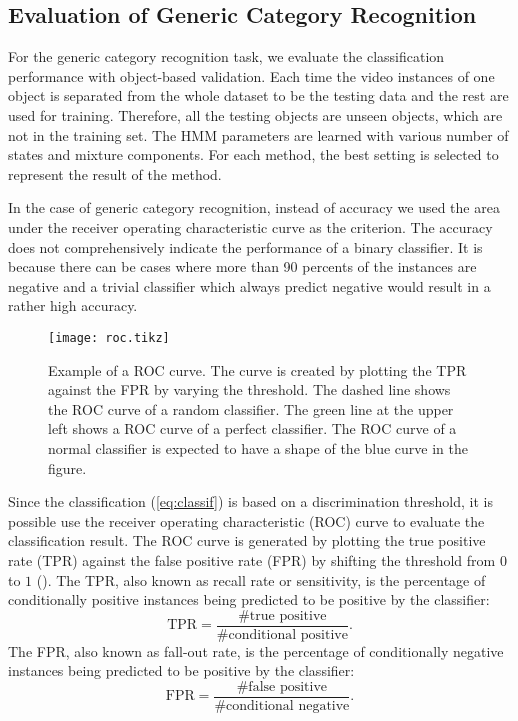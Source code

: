 \documentclass[12pt,final,twoside]{report}
\begin{document}
\subsection{Evaluation of Generic Category Recognition}
For the generic category recognition task, we evaluate the classification performance with object-based validation. Each time the video instances of one object is separated from the whole dataset to be the testing data and the rest are used for training. Therefore, all the testing objects are unseen objects, which are not in the training set. The HMM parameters are learned with various number of states and mixture components. For each method, the best setting is selected to represent the result of the method.

In the case of generic category recognition, instead of accuracy we used the area under the receiver operating characteristic curve as the criterion. The accuracy does not comprehensively indicate the performance of a binary classifier. It is because there can be cases where more than 90 percents of the instances are negative and a trivial classifier which always predict negative would result in a rather high accuracy.

\begin{figure}[t]
  \centering
  \texttt{[image: roc.tikz]}
  \caption[Example of a ROC curve.]{Example of a ROC curve. The curve is created by plotting the TPR against the FPR by varying the threshold. The dashed line shows the ROC curve of a random classifier. The green line at the upper left shows a ROC curve of a perfect classifier. The ROC curve of a normal classifier is expected to have a shape of the blue curve in the figure.}
  \label{fig:roc}
\end{figure}

Since the classification (\cref{eq:classif}) is based on a discrimination threshold, it is possible use the receiver operating characteristic (ROC) curve to evaluate the classification result. The ROC curve is generated by plotting the true positive rate (TPR) against the false positive rate (FPR) by shifting the threshold from $0$ to $1$ (). The TPR, also known as recall rate or sensitivity, is the percentage of conditionally positive instances being predicted to be positive by the classifier:
\[ \text{TPR} =  \frac{\text{\# true positive}}{\text{\# conditional positive}} . \]
The FPR, also known as fall-out rate, is the percentage of conditionally negative instances being predicted to be positive by the classifier:
\[ \text{FPR} =  \frac{\text{\# false positive}}{\text{\# conditional negative}} . \]
\end{document}
